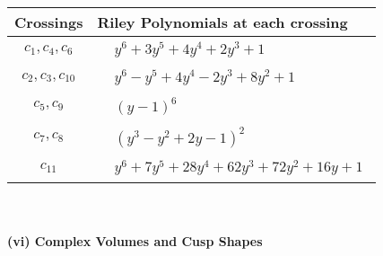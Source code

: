 \documentclass[1p]{elsarticle_modified}
\theoremstyle{definition}
\begin{document}
\begin{tabular}{m{50pt}|m{274pt}}
Crossings & \hspace{64pt}Riley Polynomials at each crossing \\
\hline $$\begin{aligned}c_{1},c_{4},c_{6}\end{aligned}$$&$\begin{aligned}
&y^6+3 y^5+4 y^4+2 y^3+1
\end{aligned}$\\
\hline $$\begin{aligned}c_{2},c_{3},c_{10}\end{aligned}$$&$\begin{aligned}
&y^6- y^5+4 y^4-2 y^3+8 y^2+1
\end{aligned}$\\
\hline $$\begin{aligned}c_{5},c_{9}\end{aligned}$$&$\begin{aligned}
&(y-1)^6
\end{aligned}$\\
\hline $$\begin{aligned}c_{7},c_{8}\end{aligned}$$&$\begin{aligned}
&(y^3- y^2+2 y-1)^2
\end{aligned}$\\
\hline $$\begin{aligned}c_{11}\end{aligned}$$&$\begin{aligned}
&y^6+7 y^5+28 y^4+62 y^3+72 y^2+16 y+1
\end{aligned}$\\
\hline
\end{tabular}\\~\\
\newpage\flushleft \textbf{(vi) Complex Volumes and Cusp Shapes}
\end{document}

